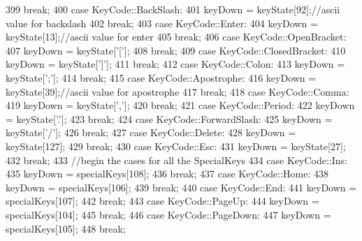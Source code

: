\begin{DoxyCode}
399         \textcolor{keywordflow}{break};
400     \textcolor{keywordflow}{case} KeyCode::BackSlash:
401         keyDown = keyState[92];\textcolor{comment}{//ascii value for backslash}
402         \textcolor{keywordflow}{break};
403     \textcolor{keywordflow}{case} KeyCode::Enter:
404         keyDown = keyState[13];\textcolor{comment}{//ascii value for enter}
405         \textcolor{keywordflow}{break};
406     \textcolor{keywordflow}{case} KeyCode::OpenBracket:
407         keyDown = keyState[\textcolor{charliteral}{'['}];
408         \textcolor{keywordflow}{break};
409     \textcolor{keywordflow}{case} KeyCode::ClosedBracket:
410         keyDown = keyState[\textcolor{charliteral}{']'}];
411         \textcolor{keywordflow}{break};
412     \textcolor{keywordflow}{case} KeyCode::Colon:
413         keyDown = keyState[\textcolor{charliteral}{';'}];
414         \textcolor{keywordflow}{break};
415     \textcolor{keywordflow}{case} KeyCode::Apostrophe:
416         keyDown = keyState[39];\textcolor{comment}{//ascii value for apostrophe}
417         \textcolor{keywordflow}{break};
418     \textcolor{keywordflow}{case} KeyCode::Comma:
419         keyDown = keyState[\textcolor{charliteral}{','}];
420         \textcolor{keywordflow}{break};
421     \textcolor{keywordflow}{case} KeyCode::Period:
422         keyDown = keyState[\textcolor{charliteral}{'.'}];
423         \textcolor{keywordflow}{break};
424     \textcolor{keywordflow}{case} KeyCode::ForwardSlash:
425         keyDown = keyState[\textcolor{charliteral}{'/'}];
426         \textcolor{keywordflow}{break};
427     \textcolor{keywordflow}{case} KeyCode::Delete:
428         keyDown = keyState[127];
429         \textcolor{keywordflow}{break};
430     \textcolor{keywordflow}{case} KeyCode::Esc:
431         keyDown = keyState[27];
432         \textcolor{keywordflow}{break};
433         \textcolor{comment}{//begin the cases for all the SpecialKeys}
434     \textcolor{keywordflow}{case} KeyCode::Ins:
435         keyDown = specialKeys[108];
436         \textcolor{keywordflow}{break};
437     \textcolor{keywordflow}{case} KeyCode::Home:
438         keyDown = specialKeys[106];
439         \textcolor{keywordflow}{break};
440     \textcolor{keywordflow}{case} KeyCode::End:
441         keyDown = specialKeys[107];
442         \textcolor{keywordflow}{break};
443     \textcolor{keywordflow}{case} KeyCode::PageUp:
444         keyDown = specialKeys[104];
445         \textcolor{keywordflow}{break};
446     \textcolor{keywordflow}{case} KeyCode::PageDown:
447         keyDown = specialKeys[105];
448         \textcolor{keywordflow}{break};

\end{DoxyCode}
